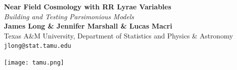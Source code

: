 \documentclass[a0,portrait]{a0poster}
\begin{document}


\begin{minipage}[b]{0.75\linewidth}
\veryHuge \color{NavyBlue} \textbf{Near Field Cosmology with RR Lyrae Variables} \color{Black}\\ %
\Huge\textit{Building and Testing Parsimonious Models}\\[2cm] %
\huge \textbf{James Long \& Jennifer Marshall \& Lucas Macri}\\[0.5cm] %
\huge Texas A\&M University, Department of Statistics and Physics \& Astronomy\\[0.4cm] %
\Large \texttt{jlong@stat.tamu.edu}\\%
\end{minipage}
%
\begin{minipage}[b]{0.25\linewidth}
\texttt{[image: tamu.png]}\\
\end{minipage}

\vspace{1cm} %

\end{document}
